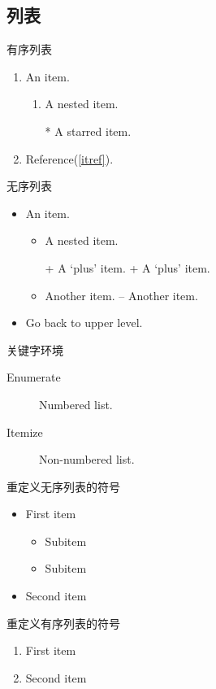 \documentclass[a4paper]{ctexart}
\begin{document}
\subsection{列表}
有序列表
\begin{enumerate}
    \item An item.
    \begin{enumerate}
        \item A nested item.\label{itref}
        \item[*] A starred item.
    \end{enumerate}
    \item Reference(\ref{itref}).
\end{enumerate}
无序列表
\begin{itemize}
    \item An item.
    \begin{itemize}
        \item A nested item.
        \item[+] A `plus' item. + A ‘plus’ item.
        \item Another item. – Another item.
    \end{itemize}
    \item Go back to upper level.
\end{itemize}
关键字环境
\begin{description}
    \item[Enumerate] Numbered list.
    \item[Itemize] Non-numbered list.
\end{description}
重定义无序列表的符号
\renewcommand{\labelitemi}{\dag}
\renewcommand{\labelitemii}{\ddag}
\begin{itemize}
    \item First item
    \begin{itemize} 
        \item Subitem
        \item Subitem
    \end{itemize}
    \item Second item
\end{itemize}
重定义有序列表的符号
\renewcommand{\labelenumi}{\Alph{enumi}>}
\begin{enumerate}
    \item First item
    \item Second item
\end{enumerate}
\end{document}
